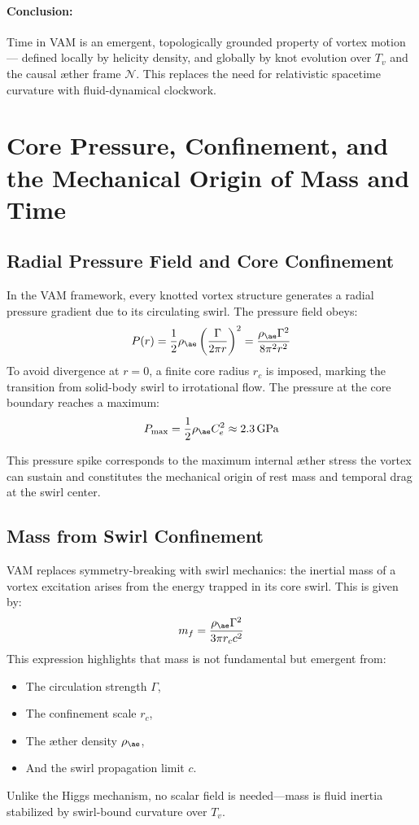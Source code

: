 \documentclass[12pt]{article}
\begin{document}
\paragraph{Conclusion:} Time in VAM is an emergent, topologically grounded property of vortex motion — defined locally by helicity density, and globally by knot evolution over \( T_v \) and the causal æther frame \( \mathcal{N} \). This replaces the need for relativistic spacetime curvature with fluid-dynamical clockwork.
\section{Core Pressure, Confinement, and the Mechanical Origin of Mass and Time}

\subsection{Radial Pressure Field and Core Confinement}

In the VAM framework, every knotted vortex structure generates a radial pressure gradient due to its circulating swirl. The pressure field obeys:
\[
P(r) = \frac{1}{2} \rho_{\ae} \left( \frac{\Gamma}{2\pi r} \right)^2 = \frac{\rho_{\ae} \Gamma^2}{8\pi^2 r^2}
\]
To avoid divergence at \( r = 0 \), a finite core radius \( r_c \) is imposed, marking the transition from solid-body swirl to irrotational flow. The pressure at the core boundary reaches a maximum:
\[
P_{\text{max}} = \frac{1}{2} \rho_{\ae} C_e^2 \approx 2.3\,\text{GPa}
\]

This pressure spike corresponds to the maximum internal æther stress the vortex can sustain and constitutes the mechanical origin of rest mass and temporal drag at the swirl center.

\subsection{Mass from Swirl Confinement}
\label{subsec:mass-from-swirl}

VAM replaces symmetry-breaking with swirl mechanics: the inertial mass of a vortex excitation arises from the energy trapped in its core swirl. This is given by:
\[
m_f = \frac{\rho_{\ae} \Gamma^2}{3\pi r_c c^2}
\]
This expression highlights that mass is not fundamental but emergent from:
\begin{itemize}
    \item The circulation strength \( \Gamma \),
    \item The confinement scale \( r_c \),
    \item The æther density \( \rho_{\ae} \),
    \item And the swirl propagation limit \( c \).
\end{itemize}
Unlike the Higgs mechanism, no scalar field is needed—mass is fluid inertia stabilized by swirl-bound curvature over \( T_v \).
\end{document}
